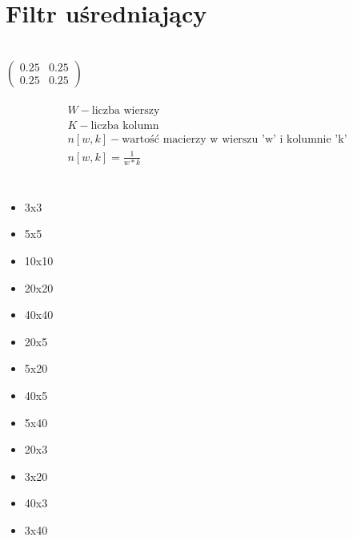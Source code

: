 \documentclass[a4paper,12pt,openany]{report}
\begin{document}
\section{Filtr uśredniający}
\\
\linebreak
$\begin{pmatrix}
0.25 & 0.25\\
0.25 & 0.25
\end{pmatrix}$
\\
\linebreak
{}
\\
\linebreak
\begin{gather*}
W - \text{liczba wierszy} \\
K - \text{liczba kolumn} \\
n[w, k] - \text{wartość macierzy w wierszu 'w' i kolumnie 'k'} \\
n[w, k] = \frac{1}{w*k}\\
\end{gather*}
\\
\linebreak
{}
\begin{itemize}
\item 3x3
\item 5x5
\item 10x10
\item 20x20
\item 40x40
\item 20x5
\item 5x20
\item 40x5
\item 5x40
\item 20x3
\item 3x20
\item 40x3
\item 3x40
\end{itemize}
\pagebreak
\end{document}
